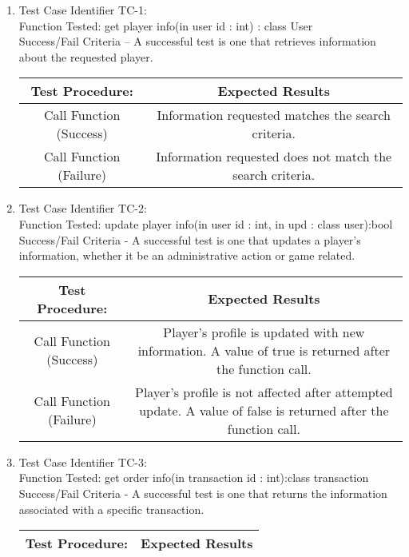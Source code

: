   \begin{enumerate}
  \item
  Test Case Identifier TC-1:\\
    Function Tested: get player info(in user id : int) : class User\\
    Success/Fail Criteria – A successful test is one that retrieves information
    about the requested player.\\

    \begin{tabular}{| c | c |}
    \hline
    \textbf{Test Procedure:} & \textbf{Expected Results} \\ \hline
    Call Function (Success) & Information requested matches the search criteria.
    \\ \hline
    Call Function (Failure) & Information requested does not match the search
    criteria. \\ \hline
    \end{tabular}
  \item
  Test Case Identifier TC-2:\\
    Function Tested: update player info(in user id : int, in upd : class
        user):bool\\
    Success/Fail Criteria - A successful test is one that updates a player's
    information, whether it be an administrative action or game related.\\
    \begin{tabular}{| c | c |}
    \hline
    \textbf{Test Procedure:} & \textbf{Expected Results} \\ \hline
    Call Function (Success) & Player's profile is updated with new information.
    A value of true is returned after the function call. \\ \hline
    Call Function (Failure) & Player's profile is not affected after attempted
    update.  A value of false is returned after the function call.\\ \hline
    \end{tabular}
  \item
  Test Case Identifier TC-3:\\
    Function Tested: get order info(in transaction id : int):class transaction\\
    Success/Fail Criteria - A successful test is one that returns the
    information associated with a specific transaction.\\
    \begin{tabular}{| c | c |}
    \hline
    \textbf{Test Procedure:} & \textbf{Expected Results} \\ \hline

\end{tabular}
\end{enumerate}
